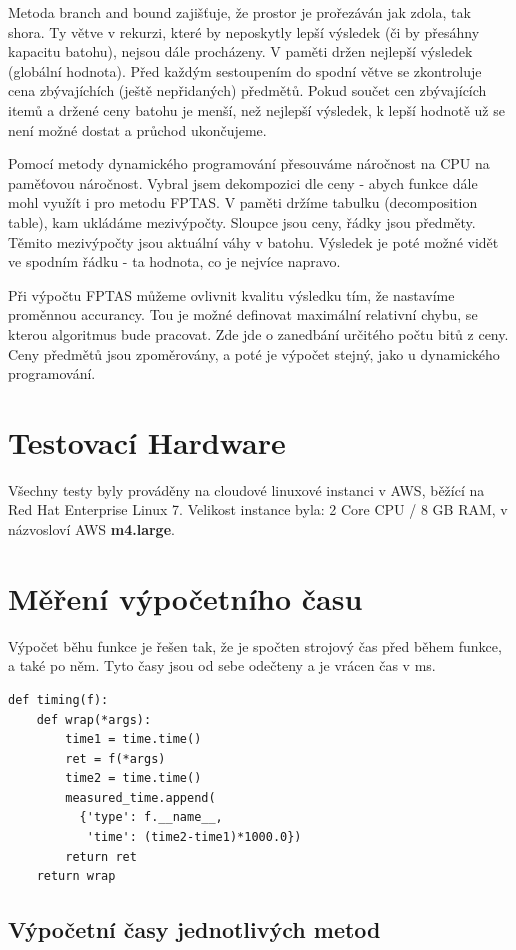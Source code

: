 \documentclass[a4paper,10pt,twocolumn]{article}
\begin{document}
Metoda branch and bound zajišťuje, že prostor je prořezáván jak zdola, tak shora. Ty větve v rekurzi, které by neposkytly lepší výsledek (či by přesáhny kapacitu batohu), nejsou dále procházeny. V paměti držen nejlepší výsledek (globální hodnota). Před každým sestoupením do spodní větve se zkontroluje cena zbývajíchích (ještě nepřidaných) předmětů. Pokud součet cen zbývajících itemů a držené ceny batohu je menší, než nejlepší výsledek, k lepší hodnotě už se není možné dostat a průchod ukončujeme.

Pomocí metody dynamického programování přesouváme náročnost na CPU na paměťovou náročnost. Vybral jsem dekompozici dle ceny - abych funkce dále mohl využít i pro metodu FPTAS. V paměti držíme tabulku (decomposition table), kam ukládáme mezivýpočty. Sloupce jsou ceny, řádky jsou předměty. Těmito mezivýpočty jsou aktuální váhy v batohu. Výsledek je poté možné vidět ve spodním řádku - ta hodnota, co je nejvíce napravo.

Při výpočtu FPTAS můžeme ovlivnit kvalitu výsledku tím, že nastavíme proměnnou accurancy. Tou je možné definovat maximální relativní chybu, se kterou algoritmus bude pracovat. Zde jde o zanedbání určitého počtu bitů z ceny. Ceny předmětů jsou zpoměrovány, a poté je výpočet stejný, jako u dynamického programování.


\section{Testovací Hardware}
Všechny testy byly prováděny na cloudové linuxové instanci v AWS, běžící na Red Hat Enterprise Linux 7. Velikost instance byla:
  2 Core CPU / 8 GB RAM, v názvosloví AWS \textbf{m4.large}.


\section{Měření výpočetního času}
Výpočet běhu funkce je řešen tak, že je spočten strojový čas před během funkce, a také po něm. Tyto časy jsou od sebe odečteny a je vrácen čas v ms.

   \begin{verbatim}
def timing(f):
    def wrap(*args):
        time1 = time.time()
        ret = f(*args)
        time2 = time.time()
        measured_time.append(
          {'type': f.__name__,
           'time': (time2-time1)*1000.0})
        return ret
    return wrap
   \end{verbatim}


\subsection{Výpočetní časy jednotlivých metod}
\end{document}
